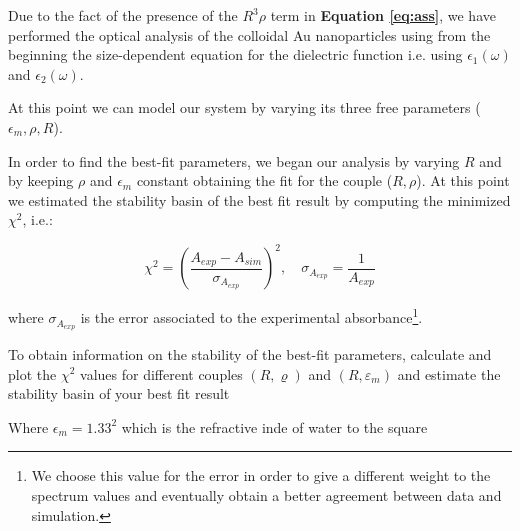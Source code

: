 \documentclass[twocolumn]{article}
\begin{document}
\begin{multicols}{2}

Due to the fact of the presence of the $R^3\rho$ term in \textbf{Equation \ref{eq:ass}}, we have performed the optical analysis of the colloidal Au nanoparticles using from the beginning the size-dependent equation for the dielectric function i.e. using $\epsilon_1(\omega)$ and $\epsilon_2(\omega)$.

At this point we can model our system by varying its three free parameters ($\epsilon_m, \rho, R$).

In order to find the best-fit parameters, we began our analysis by varying $R$ and by keeping $\rho$ and $\epsilon_m$ constant obtaining the fit for the couple ($R,\rho$). At this point we estimated the stability basin of the best fit result by computing the minimized $\chi^2$, i.e.:

 \begin{equation}
        \chi^2 = (\frac{A_{exp}-A_{sim}}{\sigma_{A_{exp}}})^2, \quad \sigma_{A_{exp}} =\frac{1}{A_{exp}} 
\end{equation}

where $\sigma_{A_{exp}}$ is the error associated to the experimental absorbance\footnote{We choose this value for the error in order to give a different weight to the spectrum values and eventually obtain a better agreement between data and simulation.}. 


To obtain information on the stability of the best-fit parameters,
calculate and plot the $\chi^{2}$ values for different couples $(R, \varrho)$ and $\left(R, \varepsilon_{m}\right)$
and estimate the stability basin of your best fit result

Where $\epsilon_m = 1.33^2$ which is the refractive inde of water to the square


\newpage


\end{multicols}
\end{document}
